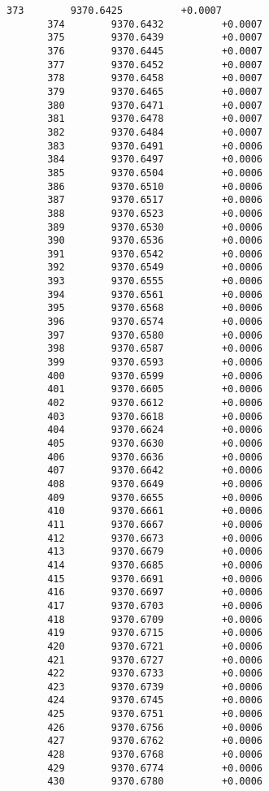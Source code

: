\documentclass[11pt]{article}
\begin{document}
\begin{Verbatim}[commandchars=\\\{\}]
       373        9370.6425          +0.0007
       374        9370.6432          +0.0007
       375        9370.6439          +0.0007
       376        9370.6445          +0.0007
       377        9370.6452          +0.0007
       378        9370.6458          +0.0007
       379        9370.6465          +0.0007
       380        9370.6471          +0.0007
       381        9370.6478          +0.0007
       382        9370.6484          +0.0007
       383        9370.6491          +0.0006
       384        9370.6497          +0.0006
       385        9370.6504          +0.0006
       386        9370.6510          +0.0006
       387        9370.6517          +0.0006
       388        9370.6523          +0.0006
       389        9370.6530          +0.0006
       390        9370.6536          +0.0006
       391        9370.6542          +0.0006
       392        9370.6549          +0.0006
       393        9370.6555          +0.0006
       394        9370.6561          +0.0006
       395        9370.6568          +0.0006
       396        9370.6574          +0.0006
       397        9370.6580          +0.0006
       398        9370.6587          +0.0006
       399        9370.6593          +0.0006
       400        9370.6599          +0.0006
       401        9370.6605          +0.0006
       402        9370.6612          +0.0006
       403        9370.6618          +0.0006
       404        9370.6624          +0.0006
       405        9370.6630          +0.0006
       406        9370.6636          +0.0006
       407        9370.6642          +0.0006
       408        9370.6649          +0.0006
       409        9370.6655          +0.0006
       410        9370.6661          +0.0006
       411        9370.6667          +0.0006
       412        9370.6673          +0.0006
       413        9370.6679          +0.0006
       414        9370.6685          +0.0006
       415        9370.6691          +0.0006
       416        9370.6697          +0.0006
       417        9370.6703          +0.0006
       418        9370.6709          +0.0006
       419        9370.6715          +0.0006
       420        9370.6721          +0.0006
       421        9370.6727          +0.0006
       422        9370.6733          +0.0006
       423        9370.6739          +0.0006
       424        9370.6745          +0.0006
       425        9370.6751          +0.0006
       426        9370.6756          +0.0006
       427        9370.6762          +0.0006
       428        9370.6768          +0.0006
       429        9370.6774          +0.0006
       430        9370.6780          +0.0006

\end{Verbatim}
\end{document}
